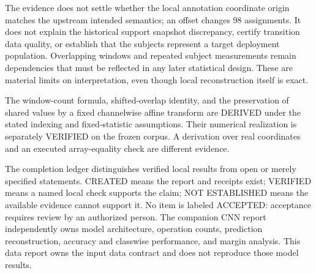 \documentclass[11pt,a4paper]{article}
\begin{document}
The evidence does not settle whether the local annotation coordinate origin matches the upstream intended semantics; an offset changes 98 assignments. It does not explain the historical support snapshot discrepancy, certify transition data quality, or establish that the subjects represent a target deployment population. Overlapping windows and repeated subject measurements remain dependencies that must be reflected in any later statistical design. These are material limits on interpretation, even though local reconstruction itself is exact.

The window-count formula, shifted-overlap identity, and the preservation of shared values by a fixed channelwise affine transform are DERIVED under the stated indexing and fixed-statistic assumptions. Their numerical realization is separately VERIFIED on the frozen corpus. A derivation over real coordinates and an executed array-equality check are different evidence.

The completion ledger distinguishes verified local results from open or merely specified statements. CREATED means the report and receipts exist; VERIFIED means a named local check supports the claim; NOT ESTABLISHED means the available evidence cannot support it. No item is labeled ACCEPTED: acceptance requires review by an authorized person. The companion CNN report independently owns model architecture, operation counts, prediction reconstruction, accuracy and classwise performance, and margin analysis. This data report owns the input data contract and does not reproduce those model results.
\end{document}
